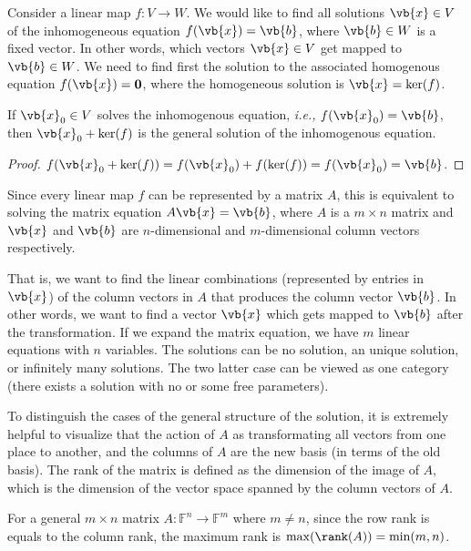\documentclass[a4paper,12pt]{report}
\begin{document}
Consider a linear map \(f:V \to W\). We would like to find all solutions \(\vb{x} \in V\) of the inhomogeneous equation \(f(\vb{x} ) = \vb{b} \), where \(\vb{b} \in W\) is a fixed vector. In other words, which vectors \(\vb{x}  \in V\) get mapped to \(\vb{b} \in W\). We need to find first the solution to the associated homogenous equation \(f(\vb{x} ) = \boldsymbol{0} \), where the homogeneous solution is \(\vb{x} = \ker (f)\).     

\begin{lemma} \label{homoinhomo} 
If \(\vb{x} _{0} \in V\) solves the inhomogenous equation, \textit{i.e.,} \(f(\vb{x} _{0} ) = \vb{b}\), then \(\vb{x} _{0} + \ker (f) \) is the general solution of the inhomogenous equation.   
\end{lemma}

\begin{proof}  
    \(f(\vb{x} _{0} + \ker (f)) = f(\vb{x} _{0} ) + f(\ker (f)) = f(\vb{x} _{0} ) = \vb{b} \). 
\end{proof}

Since every linear map \(f\) can be represented by a matrix \(A\), this is equivalent to solving the matrix equation \(A\vb{x} = \vb{b} \), where \(A\) is a \(m \times n\) matrix and \(\vb{x} \) and \(\vb{b} \) are \(n\)-dimensional and \(m\)-dimensional column vectors respectively. 

That is, we want to find the linear combinations (represented by entries in \(\vb{x} \)) of the column vectors in \(A\) that produces the column vector \(\vb{b} \). In other words, we want to find a vector \(\vb{x} \) which gets mapped to \(\vb{b} \) after the transformation. If we expand the matrix equation, we have \(m\) linear equations with \(n\) variables. The solutions can be no solution, an unique solution, or infinitely many solutions. The two latter case can be viewed as one category (there exists a solution with no or some free parameters).

To distinguish the cases of the general structure of the solution, it is extremely helpful to visualize that the action of \(A\) as transformating all vectors from one place to another, and the columns of \(A\) are the new basis (in terms of the old basis). The rank of the matrix is defined as the dimension of the image of \(A\), which is the dimension of the vector space spanned by the column vectors of \(A\). 

For a general \(m \times n\) matrix \(A:\mathbb{F}^{n}\to \mathbb{F}^{m}  \) where \(m \neq n\), since the row rank is equals to the column rank, the maximum rank is \(\max (\rank (A)) = \min (m,n)\). 
\end{document}
